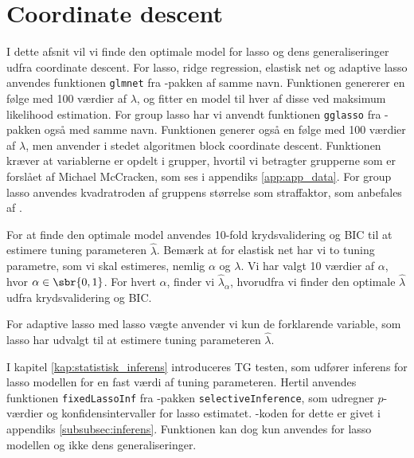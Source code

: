 \section{Coordinate descent}
I dette afsnit vil vi finde den optimale model for lasso og dens generaliseringer udfra coordinate descent.
For lasso, ridge regression, elastisk net og adaptive lasso anvendes funktionen \texttt{glmnet} fra \Rlang-pakken af samme navn.
Funktionen genererer en følge med 100 værdier af $\lambda$, og fitter en model til hver af disse ved maksimum likelihood estimation.
For group lasso har vi anvendt funktionen \texttt{gglasso} fra \Rlang-pakken også med samme navn. 
Funktionen generer også en følge med 100 værdier af $\lambda$, men anvender i stedet algoritmen block coordinate descent. 
Funktionen kræver at variablerne er opdelt i grupper, hvortil vi betragter grupperne som er forslået af Michael McCracken, som ses i appendiks \ref{app:app_data}. 
For group lasso anvendes kvadratroden af gruppens størrelse som straffaktor, som anbefales af \citep{group_lasso}.

For at finde den optimale model anvendes 10-fold krydsvalidering og BIC til at estimere tuning parameteren $\widehat\lambda$.
Bemærk at for elastisk net har vi to tuning parametre, som vi skal estimeres, nemlig $\alpha$ og $\lambda$.  
Vi har valgt 10 værdier af \(\alpha\), hvor $\alpha \in \sbr{0,1}$.
For hvert \(\alpha\), finder vi \(\widehat{\lambda}_\alpha\), hvorudfra vi finder den optimale \(\widehat{\lambda}\) udfra krydsvalidering og BIC.

For adaptive lasso med lasso vægte anvender vi kun de forklarende variable, som lasso har udvalgt til at estimere tuning parameteren $\widehat{\lambda}$. 

I kapitel \ref{kap:statistisk_inferens} introduceres TG testen, som udfører inferens for lasso modellen for en fast værdi af tuning parameteren.
Hertil anvendes funktionen \texttt{fixedLassoInf} fra \Rlang-pakken \texttt{selectiveInference}, som udregner \(p\)-værdier og konfidensintervaller for lasso estimatet.
\Rlang-koden for dette er givet i appendiks \ref{subsubsec:inferens}.
Funktionen kan dog kun anvendes for lasso modellen og ikke dens generaliseringer. 







